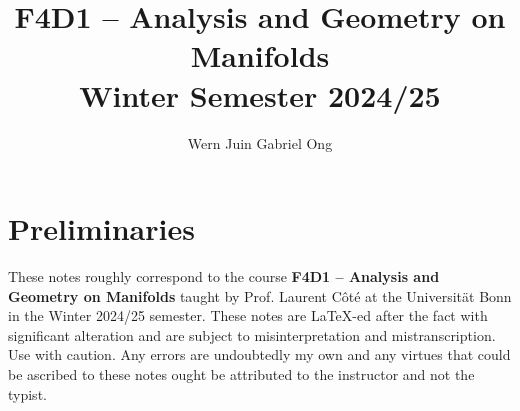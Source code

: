 \documentclass{amsart}
\theoremstyle{definition}
\numberwithin{equation}{section}
\begin{document}
\large
\title[Analysis and Geometry on Manifolds -- Bonn, Winter 2024/25]{F4D1 -- Analysis and Geometry on Manifolds \\ Winter Semester 2024/25}
\author{Wern Juin Gabriel Ong}
\address{Universit\"{a}t Bonn, Bonn, D-53113}
\maketitle
\section*{Preliminaries}
These notes roughly correspond to the course \textbf{F4D1 -- Analysis and Geometry on Manifolds} taught by Prof. Laurent C\^{o}t\'{e} at the Universit\"{a}t Bonn in the Winter 2024/25 semester. These notes are \LaTeX-ed after the fact with significant alteration and are subject to misinterpretation and mistranscription. Use with caution. Any errors are undoubtedly my own and any virtues that could be ascribed to these notes ought be attributed to the instructor and not the typist. 
\newpage
\tableofcontents
























\newpage
\printbibliography
\end{document}
